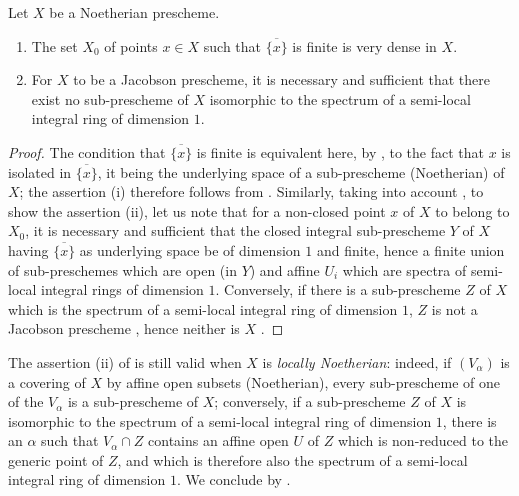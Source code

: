 \begin{proposition}[10.5.5]
\label{IV.10.5.5}
Let $X$ be a Noetherian prescheme.
\begin{enumerate}[label=(\roman*)]
  \item The set $X_0$ of points $x\in X$ such that $\overline{\{x\}}$ is finite is very dense in $X$.
  \item For $X$ to be a Jacobson prescheme, it is necessary and sufficient that there exist no sub-prescheme of $X$ isomorphic to the spectrum of a semi-local integral ring of dimension $1$.
\end{enumerate}
\end{proposition}

\begin{proof}
The condition that $\overline{\{x\}}$ is finite is equivalent here, by , to the fact that $x$ is isolated in $\overline{\{x\}}$, it being the underlying space of a sub-prescheme (Noetherian) of $X$; the assertion (i) therefore follows from .
Similarly, taking into account , to show the assertion (ii), let us note that for a non-closed point $x$ of $X$ to belong to $X_0$, it is necessary and sufficient that the closed integral sub-prescheme $Y$ of $X$ having $\overline{\{x\}}$ as underlying space be of dimension $1$ and finite, hence a finite union of sub-preschemes which are open (in $Y$) and affine $U_i$ which are spectra of semi-local integral rings of dimension $1$.
Conversely, if there is a sub-prescheme $Z$ of $X$ which is the spectrum of a semi-local integral ring of dimension $1$, $Z$ is not a Jacobson prescheme , hence neither is $X$ .
\end{proof}


\begin{remark}[10.5.6]
\label{IV.10.5.6}
The assertion (ii) of  is still valid when $X$ is \emph{locally Noetherian}: indeed, if $(V_\alpha)$ is a covering of $X$ by affine open subsets (Noetherian), every sub-prescheme of one of the $V_\alpha$ is a sub-prescheme of $X$; conversely, if a sub-prescheme $Z$ of $X$ is isomorphic to the spectrum of a semi-local integral ring of dimension $1$, there is an $\alpha$ such that $V_\alpha\cap Z$ contains an affine open $U$ of $Z$ which is non-reduced to the generic point of $Z$, and which is therefore also the spectrum of a semi-local integral ring of dimension $1$.
We conclude by .
\end{remark}

